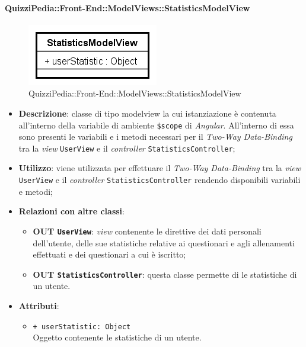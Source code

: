 \paragraph{QuizziPedia::Front-End::ModelViews::StatisticsModelView}

\label{QuizziPedia::Front-End::ModelViews::StatisticsModelView}

\begin{figure}[ht]
	\centering
	\includegraphics[scale=0.5,keepaspectratio]{UML/Classi/Front-End/QuizziPedia_Front-end_ModelView_StatisticsModelView.png}
	\caption{QuizziPedia::Front-End::ModelViews::StatisticsModelView}
\end{figure} \FloatBarrier

\begin{itemize}
	\item \textbf{Descrizione}: classe di tipo modelview la cui istanziazione è contenuta all'interno della variabile di ambiente \texttt{\$scope} di \textit{Angular}. All'interno di essa sono presenti le variabili e i metodi necessari per il \textit{Two-Way Data-Binding} tra la \textit{view} \texttt{UserView} e il \textit{controller} \texttt{StatisticsController};
	\item \textbf{Utilizzo}: viene utilizzata per effettuare il \textit{Two-Way Data-Binding} tra la \textit{view} \texttt{UserView} e il \textit{controller} \texttt{StatisticsController} rendendo disponibili variabili e metodi;
	\item \textbf{Relazioni con altre classi}: 
	\begin{itemize}
		\item \textbf{OUT \texttt{UserView}}: \textit{view} contenente le direttive dei dati personali dell'utente, delle sue statistiche relative ai questionari e agli allenamenti effettuati e dei questionari a cui è iscritto; 
		\item \textbf{OUT \texttt{StatisticsController}}: questa classe permette di le statistiche di un utente.
	\end{itemize}
	\item \textbf{Attributi}: 
	\begin{itemize}
		\item \texttt{+ userStatistic: Object} \\ Oggetto contenente le statistiche di un utente.
	\end{itemize}
\end{itemize}	

